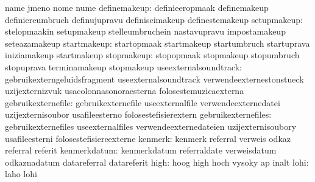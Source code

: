                                   name                             jmeno
                                  nome                             nume
                    definemakeup: definieeropmaak                  definemakeup
                                  definiereumbruch                 definujupravu
                                  definiscimakeup                  definestemakeup %
                     setupmakeup: stelopmaakin                     setupmakeup
                                  stelleumbruchein                 nastavupravu
                                  impostamakeup                    seteazamakeup
                     startmakeup: startopmaak                      startmakeup
                                  startumbruch                     startuprava
                                  iniziamakeup                     startmakeup
                      stopmakeup: stopopmaak                       stopmakeup
                                  stopumbruch                      stopuprava
                                  terminamakeup                    stopmakeup
           useexternalsoundtrack: gebruikexterngeluidsfragment     useexternalsoundtrack
                                  verwendeexternestonstueck        uzijexternizvuk
                                  usacolonnasonoraesterna          folosestemuzicaexterna
              gebruikexternefile: gebruikexternefile               useexternalfile
                                  verwendeexternedatei             uzijexternisoubor
                                  usafileesterno                   folosestefisierextern
             gebruikexternefiles: gebruikexternefiles              useexternalfiles
                                  verwendeexternedateien           uzijexternisoubory
                                  usafileesterni                   folosestefisiereexterne
                         kenmerk: kenmerk                          referral
                                  verweis                          odkaz
                                  referral                         referit %
                    kenmerkdatum: kenmerkdatum                     referraldate
                                  verweisdatum                     odkaznadatum
                                  datareferral                     datareferit
                            high: hoog                             high
                                  hoch                             vysoky
                                  ap                               inalt
                            lohi: laho                             lohi
